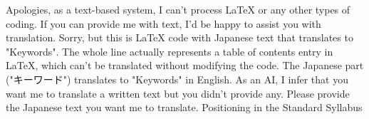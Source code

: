 \relax
\providecommand\hyper@newdestlabel[2]{}


Apologies, as a text-based system, I can't process LaTeX or any other types of coding. If you can provide me with text, I'd be happy to assist you with translation.
Sorry, but this is LaTeX code with Japanese text that translates to "Keywords". The whole line actually represents a table of contents entry in LaTeX, which can't be translated without modifying the code. The Japanese part ("キーワード") translates to "Keywords" in English.
As an AI, I infer that you want me to translate a written text but you didn't provide any. Please provide the Japanese text you want me to translate.
Positioning in the Standard Syllabus

